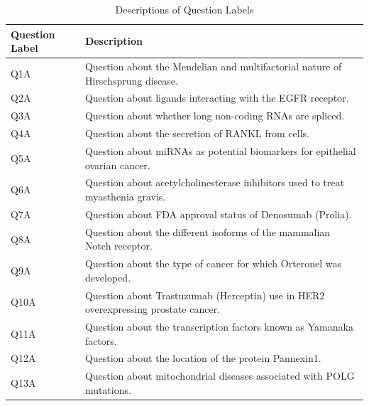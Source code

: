 \documentclass[pdflatex,sn-mathphys-num]{sn-jnl}%
\begin{document}
\begin{appendices}
\begin{table}[h]
\caption{Descriptions of Question Labels}\label{tab:descriptions}
\begin{tabular}{@{}lp{12cm}@{}}
\toprule
\textbf{Question Label} & \textbf{Description} \\
\midrule
Q1A & Question about the Mendelian and multifactorial nature of Hirschsprung disease. \\
Q2A & Question about ligands interacting with the EGFR receptor. \\
Q3A & Question about whether long non-coding RNAs are spliced. \\
Q4A & Question about the secretion of RANKL from cells. \\
Q5A & Question about miRNAs as potential biomarkers for epithelial ovarian cancer. \\
Q6A & Question about acetylcholinesterase inhibitors used to treat myasthenia gravis. \\
Q7A & Question about FDA approval status of Denosumab (Prolia). \\
Q8A & Question about the different isoforms of the mammalian Notch receptor. \\
Q9A & Question about the type of cancer for which Orteronel was developed. \\
Q10A & Question about Trastuzumab (Herceptin) use in HER2 overexpressing prostate cancer. \\
Q11A & Question about the transcription factors known as Yamanaka factors. \\
Q12A & Question about the location of the protein Pannexin1. \\
Q13A & Question about mitochondrial diseases associated with POLG mutations. \\
\bottomrule
\end{tabular}
\end{table}


\end{appendices}
\end{document}
